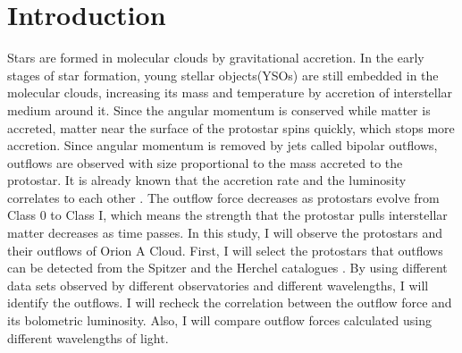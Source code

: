 
\section{Introduction}

Stars are formed in molecular clouds by gravitational accretion. In the early stages of star formation, young stellar objects(YSOs) are still embedded in the molecular clouds, increasing its mass and temperature by accretion of interstellar medium around it. Since the angular momentum is conserved while matter is accreted, matter near the surface of the protostar spins quickly, which stops more accretion. Since angular momentum is removed by jets called bipolar outflows, outflows are observed with size proportional to the mass accreted to the protostar\cite{bontemps1996evolution}. 
It is already known that the accretion rate and the luminosity correlates to each other \cite{kang2013outflow}. The outflow force decreases as protostars evolve from Class 0 to Class I, which means the strength that the protostar pulls interstellar matter decreases as time passes. 
In this study, I will observe the protostars and their outflows of Orion A Cloud. First, I will select the protostars that outflows can be detected from the Spitzer and the Herchel catalogues \cite{megeath2012spitzer, furlan2016herschel}. By using different data sets observed by different observatories and different wavelengths, I will identify the outflows. I will recheck the correlation between the outflow force and its bolometric luminosity. Also, I will compare outflow forces calculated using different wavelengths of light. 